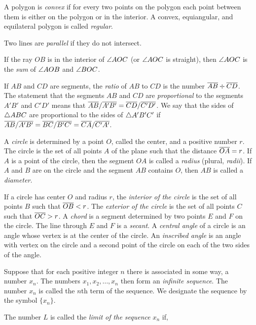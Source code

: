 \documentclass[11pt]{book}
\begin{document}
\begin{applist}
      A polygon is \emph{convex} if for every two points on the polygon each
      point between them is either on the polygon or in the interior. A
      convex, equiangular, and equilateral polygon is called \emph{regular}.
\item Two lines are \emph{parallel} if they do not intersect.
\item If the ray $OB$ is in the interior of $\angle AOC$ (or $\angle AOC$ is
      straight), then $\angle AOC$ is the \emph{sum} of $\angle AOB$ and
      $\angle BOC$.
\item If $AB$ and $CD$ are segments, the \emph{ratio} of $AB$ to $CD$ is the
      number $\overline{AB} \div \overline{CD}$. The statement that the segments $AB$
      and $CD$ are \emph{proportional} to the segments $A'B'$ and $C'D'$
      means that $\overline{AB}/\overline{A'B'} = \overline{CD}/\overline{C'D'}$. We say that the
      sides of $\triangle ABC$ are proportional to the sides of $\triangle A'B'C'$
      if $\overline{AB}/\overline{A'B'} = \overline{BC}/\overline{B'C'} = \overline{CA}/\overline{C'A'}$.
\item A \emph{circle} is determined by a point $O$, called the center, and a
      positive number $r$. The circle is the set of all points $A$ of the
      plane such that the distance $\overline{OA} = r$. If $A$ is a point of the
      circle, then the segment $OA$ is called a \emph{radius} (plural,
      \emph{radii}). If $A$ and $B$ are on the circle and the segment $AB$
      contains $O$, then $AB$ is called a \emph{diameter}.
\item If a circle has center $O$ and radius $r$, the \emph{interior of the
      circle} is the set of all points $B$ such that $\overline{OB} < r$. The
      \emph{exterior of the circle} is the set of all points $C$ such that
      $\overline{OC} > r$. A \emph{chord} is a segment determined by two points
      $E$ and $F$ on the circle. The line through $E$ and $F$ is a
      \emph{secant}. A \emph{central angle} of a circle is an angle whose
      vertex is at the center of the circle. An \emph{inscribed angle} is an
      angle with vertex on the circle and a second point of the circle on
      each of the two sides of the angle.
\item Suppose that for each positive integer $n$ there is associated in some
      way, a number $x_n$. The numbers $x_1, x_2, \ldots, x_n$ then form an
      \emph{infinite sequence}. The number $x_n$ is called the $n$th term of
      the sequence. We designate the sequence by the symbol $\{x_n\}$.
\item The number $L$ is called the \emph{limit of the sequence} $x_n$ if,

\end{applist}
\end{document}
